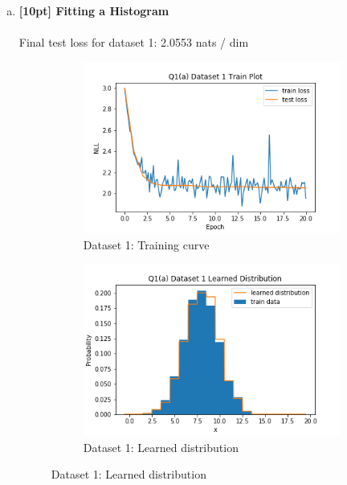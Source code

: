 \documentclass{article}
\begin{document}
\begin{enumerate}[(a)]

\item {\bf [10pt] Fitting a Histogram} \\\\
Final test loss for dataset 1: 2.0553 nats / dim
\begin{figure}[H]
    \centering
    \begin{subfigure}{0.45\textwidth}
        \centering
        \includegraphics[width=\textwidth]{figures/q1_a_dset1_train_plot.png}
        \caption{Dataset 1: Training curve}
    \end{subfigure}
    \hspace{0.2in}
    \begin{subfigure}{0.45\textwidth}
        \centering
        \includegraphics[width=\textwidth]{figures/q1_a_dset1_learned_dist.png}
        \caption{Dataset 1: Learned distribution}

\end{subfigure}
\end{figure}
\end{enumerate}
\end{document}
